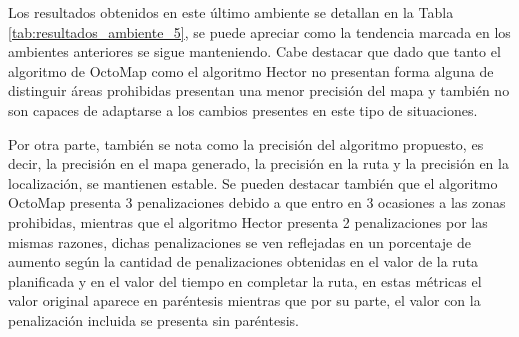 Los resultados obtenidos en este último ambiente se detallan en la Tabla \ref{tab:resultados_ambiente_5}, se puede apreciar como la tendencia marcada en los ambientes anteriores se sigue manteniendo. Cabe destacar que dado que tanto el algoritmo de OctoMap como el algoritmo Hector no presentan forma alguna de distinguir áreas prohibidas presentan una menor precisión del mapa y también no son capaces de adaptarse a los cambios presentes en este tipo de situaciones. 

Por otra parte, también se nota como la precisión del algoritmo propuesto, es decir, la precisión en el mapa generado, la precisión en la ruta y la precisión en la localización, se mantienen estable. Se pueden destacar también que el algoritmo OctoMap presenta 3 penalizaciones debido a que entro en 3 ocasiones a las zonas prohibidas, mientras que el algoritmo Hector presenta 2 penalizaciones por las mismas razones, dichas penalizaciones se ven reflejadas en un porcentaje de aumento según la cantidad de penalizaciones obtenidas en el valor de la ruta planificada y en el valor del tiempo en completar la ruta, en estas métricas el valor original aparece en paréntesis mientras que por su parte, el valor con la penalización incluida se presenta sin paréntesis.

